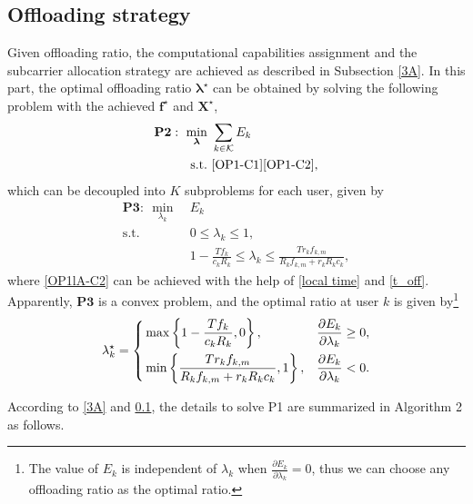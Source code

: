 \documentclass[journal]{IEEEtran}
\begin{document}
\subsection{Offloading strategy}\label{3B}
Given offloading ratio, the computational capabilities assignment and the subcarrier allocation strategy are achieved as described in Subsection \ref{3A}. In this part, the optimal offloading ratio $\boldsymbol{\lambda}^\star$ can be obtained by solving the following problem with the achieved $\boldsymbol{f}^\star$ and $\boldsymbol{X}^\star$,
\begin{equation}\label{OP1l}
\begin{aligned}
\mathbf{P2}:~\min _{\boldsymbol{\lambda}}~&\sum_{k\in\mathcal{K}}E_{k}\\
\mathrm{s.t.}  ~&\eqref{OP1-C1}\eqref{OP1-C2},
\end{aligned}
\end{equation}
which can be decoupled into $K$ subproblems for each user, given by
\begin{subequations}\label{OP1lA}
\begin{align}
\mathbf{P3}:~\min _{\lambda_{k}}~&E_{k}\\
\mathrm{s.t.}  ~& 0\leq \lambda_{k}\leq 1,\label{OP1lA-C1}\\
~&  1-\frac{Tf_{k}}{c_{k}R_{k}} \leq \lambda_{k} \leq \frac{Tr_{k}f_{k,m}}{R_{k}f_{k,m}+r_{k}R_{k}c_{k}},\label{OP1lA-C2}
\end{align}
\end{subequations}
where \eqref{OP1lA-C2} can be achieved with the help of \eqref{local time} and \eqref{t_off}. Apparently, $\mathbf{P3}$ is a convex problem, and the optimal ratio at user $k$ is given by\footnote{The value of $E_{k}$ is independent of $\lambda_{k}$ when $\frac{\partial E_{k}}{\partial \lambda_{k}}=0$, thus we can choose any offloading ratio as the optimal ratio.}
\begin{equation}{\label{OP-lkm}}
 \lambda_{k}^\star= 
\left\{
\begin{aligned}
&\max\left\{1-\frac{Tf_{k}}{c_{k}R_{k}},0\right\},    &\frac{\partial E_{k}}{\partial \lambda_{k}} \geq 0,\\
&\min \left\{\frac{Tr_{k}f_{k,m}}{R_{k}f_{k,m}+r_{k}R_{k}c_{k}},1\right\},  &\frac{\partial E_{k}}{\partial \lambda_{k}}< 0.
\end{aligned}
\right.
\end{equation}

According to \ref{3A} and \ref{3B}, the details to solve P1 are summarized in Algorithm 2 as follows.

%
\end{document}
